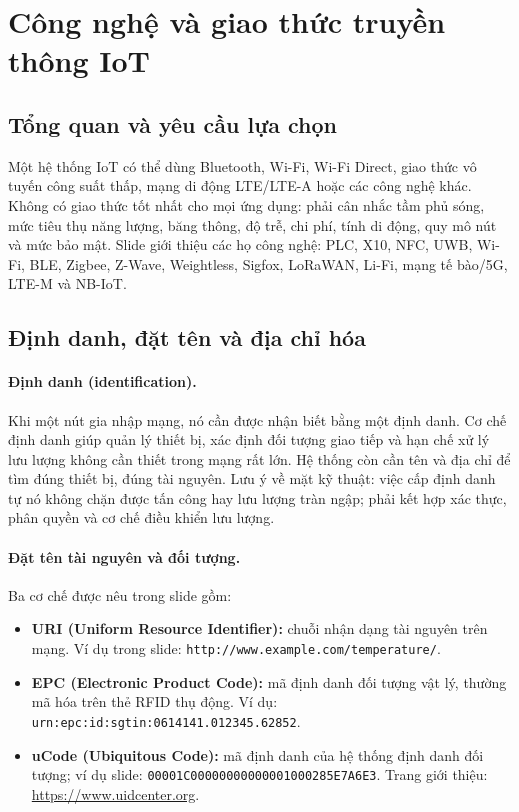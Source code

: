 \section{Công nghệ và giao thức truyền thông IoT}
\subsection{Tổng quan và yêu cầu lựa chọn}
Một hệ thống IoT có thể dùng Bluetooth, Wi-Fi, Wi-Fi Direct, giao thức vô tuyến công suất thấp, mạng di động LTE/LTE-A hoặc các công nghệ khác. Không có giao thức tốt nhất cho mọi ứng dụng: phải cân nhắc tầm phủ sóng, mức tiêu thụ năng lượng, băng thông, độ trễ, chi phí, tính di động, quy mô nút và mức bảo mật. Slide giới thiệu các họ công nghệ: PLC, X10, NFC, UWB, Wi-Fi, BLE, Zigbee, Z-Wave, Weightless, Sigfox, LoRaWAN, Li-Fi, mạng tế bào/5G, LTE-M và NB-IoT. 

\subsection{Định danh, đặt tên và địa chỉ hóa}
\paragraph{Định danh (identification).} Khi một nút gia nhập mạng, nó cần được nhận biết bằng một định danh. Cơ chế định danh giúp quản lý thiết bị, xác định đối tượng giao tiếp và hạn chế xử lý lưu lượng không cần thiết trong mạng rất lớn. Hệ thống còn cần tên và địa chỉ để tìm đúng thiết bị, đúng tài nguyên. Lưu ý về mặt kỹ thuật: việc cấp định danh tự nó không chặn được tấn công hay lưu lượng tràn ngập; phải kết hợp xác thực, phân quyền và cơ chế điều khiển lưu lượng. 

\paragraph{Đặt tên tài nguyên và đối tượng.} Ba cơ chế được nêu trong slide gồm:
\begin{itemize}
\item \textbf{URI (Uniform Resource Identifier):} chuỗi nhận dạng tài nguyên trên mạng. Ví dụ trong slide: \texttt{http://www.example.com/temperature/}.
\item \textbf{EPC (Electronic Product Code):} mã định danh đối tượng vật lý, thường mã hóa trên thẻ RFID thụ động. Ví dụ: \texttt{urn:epc:id:sgtin:}\allowbreak\texttt{0614141.012345.62852}.
\item \textbf{uCode (Ubiquitous Code):} mã định danh của hệ thống định danh đối tượng; ví dụ slide: \texttt{00001C0000000000}\allowbreak\texttt{0001000285E7A6E3}. Trang giới thiệu: \url{https://www.uidcenter.org}.
\end{itemize}

